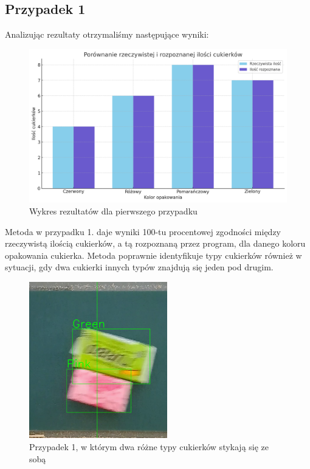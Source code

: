 \documentclass{article}
\begin{document}
\subsection{Przypadek 1}
Analizując rezultaty otrzymaliśmy następujące wyniki:

\begin{figure}[H]
    \centering
    \includegraphics[width=\linewidth]{wykres1.png}
    \caption{Wykres rezultatów dla pierwszego przypadku}
    \label{fig:przypadek1}
\end{figure}


Metoda w przypadku 1. daje wyniki 100-tu procentowej zgodności między rzeczywistą ilością cukierków, a tą rozpoznaną przez program, dla danego koloru opakowania cukierka. Metoda poprawnie identyfikuje typy cukierków również w sytuacji, gdy dwa cukierki innych typów znajdują się jeden pod drugim.

\begin{figure}
    \centering
    \includegraphics[width=6cm]{badanie.png}
    \caption{Przypadek 1, w którym dwa różne typy cukierków stykają się ze sobą}
\end{figure}
\end{document}
